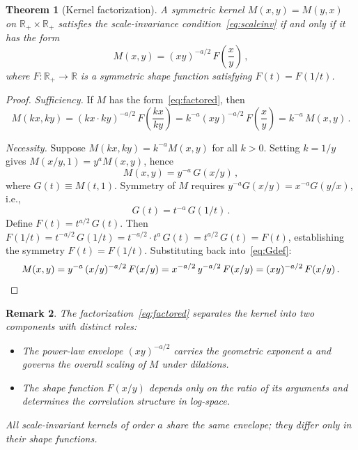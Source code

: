 \documentclass[12pt]{article}
\newtheorem{theorem}{Theorem}
\newtheorem{remark}[theorem]{Remark}
\begin{document}
\begin{theorem}[Kernel factorization]\label{thm:factorization}
A symmetric kernel $M(x,y) = M(y,x)$ on $\mathbb{R}_+ \times \mathbb{R}_+$ satisfies the scale-invariance condition~\eqref{eq:scaleinv} if and only if it has the form
\begin{equation}\label{eq:factored}
M(x,y) = (xy)^{-a/2}\, F\!\left(\frac{x}{y}\right)\,,
\end{equation}
where $F: \mathbb{R}_+ \to \mathbb{R}$ is a symmetric shape function satisfying $F(t) = F(1/t)$.
\end{theorem}

\begin{proof}
\emph{Sufficiency.} If $M$ has the form~\eqref{eq:factored}, then
\[
M(kx,ky) = (kx \cdot ky)^{-a/2}\, F\!\left(\frac{kx}{ky}\right) = k^{-a}(xy)^{-a/2}\, F\!\left(\frac{x}{y}\right) = k^{-a}\, M(x,y)\,.
\]

\emph{Necessity.} Suppose $M(kx,ky) = k^{-a} M(x,y)$ for all $k > 0$. Setting $k = 1/y$ gives $M(x/y, 1) = y^a M(x,y)$, hence
\begin{equation}\label{eq:Gdef}
M(x,y) = y^{-a}\, G(x/y)\,,
\end{equation}
where $G(t) \equiv M(t,1)$. Symmetry of $M$ requires $y^{-a} G(x/y) = x^{-a} G(y/x)$, i.e.,
\begin{equation}\label{eq:Gsym}
G(t) = t^{-a}\, G(1/t)\,.
\end{equation}
Define $F(t) = t^{a/2}\, G(t)$. Then $F(1/t) = t^{-a/2}\, G(1/t) = t^{-a/2} \cdot t^a \, G(t) = t^{a/2}\, G(t) = F(t)$, establishing the symmetry $F(t) = F(1/t)$. Substituting back into~\eqref{eq:Gdef}:
\[
M(x,y) = y^{-a}\, (x/y)^{-a/2}\, F(x/y) = x^{-a/2}\, y^{-a/2}\, F(x/y) = (xy)^{-a/2}\, F(x/y)\,. \qedhere
\]
\end{proof}

\begin{remark}\label{rem:separation}
The factorization~\eqref{eq:factored} separates the kernel into two components with distinct roles:
\begin{itemize}[nosep]
\item The \emph{power-law envelope} $(xy)^{-a/2}$ carries the geometric exponent $a$ and governs the overall scaling of $M$ under dilations.
\item The \emph{shape function} $F(x/y)$ depends only on the ratio of its arguments and determines the correlation structure in log-space.
\end{itemize}
All scale-invariant kernels of order $a$ share the same envelope; they differ only in their shape functions.
\end{remark}
\end{document}
